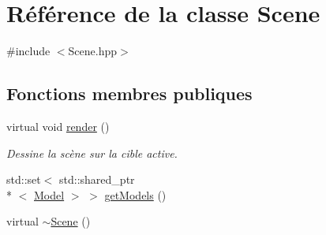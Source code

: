 \hypertarget{classScene}{\section{Référence de la classe Scene}
\label{classScene}
}


{\ttfamily \#include $<$Scene.\+hpp$>$}

\subsection*{Fonctions membres publiques}
\begin{DoxyCompactItemize}
\item 
virtual void \hyperlink{classScene_a4ddf2d16f371ee9533b3faf1dd5ddfb1}{render} ()
\begin{DoxyCompactList}\small\item\em Dessine la scène sur la cible active. \end{DoxyCompactList}\item 
std\+::set$<$ std\+::shared\+\_\+ptr\\*
$<$ \hyperlink{classModel}{Model} $>$ $>$ \hyperlink{classScene_ad45e9836644de1d4c89a7a250654a409}{get\+Models} ()
\item 
virtual \hyperlink{classScene_aa0a5be58e2ee2d1fdafc5fb46b5e661e}{$\sim$\+Scene} ()
\end{DoxyCompactItemize}
